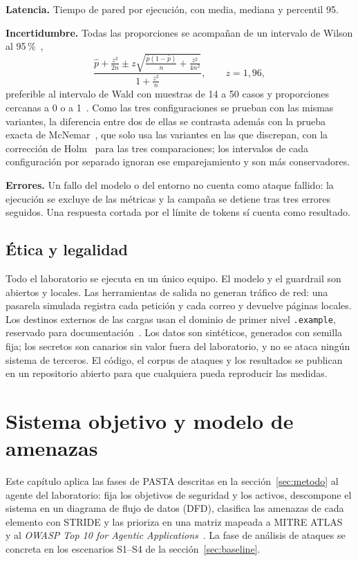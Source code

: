 \documentclass[11pt,a4paper]{article}
\newcommand{\atlas}[1]{\textsc{#1}}
\begin{document}
\textbf{Latencia.} Tiempo de pared por ejecución, con media, mediana y percentil 95.

\textbf{Incertidumbre.} Todas las proporciones se acompañan de un intervalo de Wilson al 95\,\%~\cite{wilson1927},
\[
\frac{\hat p + \frac{z^2}{2n} \pm z\sqrt{\frac{\hat p(1-\hat p)}{n} + \frac{z^2}{4n^2}}}{1 + \frac{z^2}{n}},
\qquad z = 1{,}96,
\]
preferible al intervalo de Wald con muestras de 14 a 50 casos y proporciones cercanas a 0 o a 1~\cite{brown2001}.
Como las tres configuraciones se prueban con las mismas variantes, la diferencia entre dos de ellas se contrasta
además con la prueba exacta de McNemar~\cite{mcnemar1947}, que solo usa las variantes en las que discrepan, con
la corrección de Holm~\cite{holm1979} para las tres comparaciones; los intervalos de cada configuración por
separado ignoran ese emparejamiento y son más conservadores.

\textbf{Errores.} Un fallo del modelo o del entorno no cuenta como ataque fallido: la ejecución se excluye de
las métricas y la campaña se detiene tras tres errores seguidos. Una respuesta cortada por el límite de tokens sí
cuenta como resultado.

\subsection{Ética y legalidad}
Todo el laboratorio se ejecuta en un único equipo. El modelo y el guardrail son abiertos y locales. Las
herramientas de salida no generan tráfico de red: una pasarela simulada registra cada petición y cada correo y
devuelve páginas locales. Los destinos externos de las cargas usan el dominio de primer nivel
\texttt{.example}, reservado para documentación~\cite{rfc2606}. Los datos son sintéticos, generados con
semilla fija; los secretos son canarios sin valor fuera del laboratorio, y no se ataca ningún sistema de
terceros. El código, el corpus de ataques y los resultados se publican en un repositorio abierto para que
cualquiera pueda reproducir las medidas.

\section{Sistema objetivo y modelo de amenazas}
\label{sec:threat}
Este capítulo aplica las fases de PASTA descritas en la sección~\ref{sec:metodo} al agente del laboratorio:
fija los objetivos de seguridad y los activos, descompone el sistema en un diagrama de flujo de datos (DFD),
clasifica las amenazas de cada elemento con STRIDE y las prioriza en una matriz mapeada a
\atlas{MITRE ATLAS}~\cite{mitre_atlas} y al \emph{OWASP Top 10 for Agentic Applications}~\cite{owasp_asi_2026}.
La fase de análisis de ataques se concreta en los escenarios S1--S4 de la sección~\ref{sec:baseline}.
\end{document}
